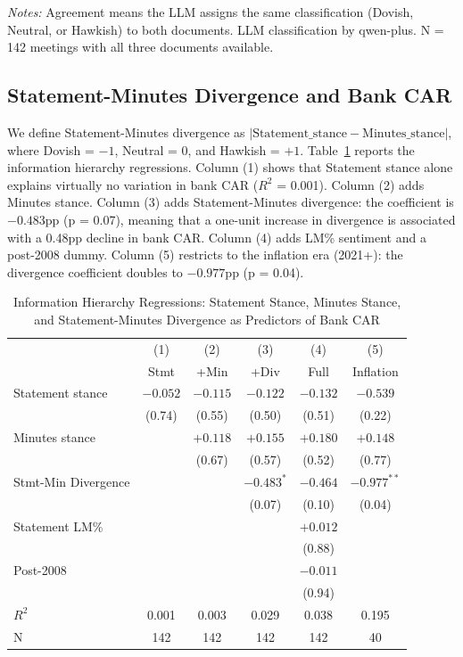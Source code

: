 \documentclass[12pt,a4paper]{article}
\begin{document}
\noindent\textit{Notes:} Agreement means the LLM assigns the same classification (Dovish, Neutral, or Hawkish) to both documents. LLM classification by qwen-plus. N = 142 meetings with all three documents available.

\subsection{Statement-Minutes Divergence and Bank CAR}

We define Statement-Minutes divergence as $|\text{Statement\_stance} - \text{Minutes\_stance}|$, where Dovish = $-1$, Neutral = 0, and Hawkish = $+1$. Table~\ref{tab:hierarchy} reports the information hierarchy regressions. Column (1) shows that Statement stance alone explains virtually no variation in bank CAR ($R^2$ = 0.001). Column (2) adds Minutes stance. Column (3) adds Statement-Minutes divergence: the coefficient is $-0.483$pp (p = 0.07), meaning that a one-unit increase in divergence is associated with a 0.48pp decline in bank CAR. Column (4) adds LM\% sentiment and a post-2008 dummy. Column (5) restricts to the inflation era (2021+): the divergence coefficient doubles to $-0.977$pp (p = 0.04).

\begin{table}[H]
\centering
\caption{Information Hierarchy Regressions: Statement Stance, Minutes Stance, and Statement-Minutes Divergence as Predictors of Bank CAR}
\label{tab:hierarchy}
\small
\begin{tabular}{lccccc}
\toprule
 & (1) & (2) & (3) & (4) & (5) \\
 & Stmt & +Min & +Div & Full & Inflation \\
\midrule
Statement stance & $-0.052$ & $-0.115$ & $-0.122$ & $-0.132$ & $-0.539$ \\
 & (0.74) & (0.55) & (0.50) & (0.51) & (0.22) \\
Minutes stance &  & $+0.118$ & $+0.155$ & $+0.180$ & $+0.148$ \\
 &  & (0.67) & (0.57) & (0.52) & (0.77) \\
Stmt-Min Divergence &  &  & $-0.483^{*}$ & $-0.464$ & $-0.977^{**}$ \\
 &  &  & (0.07) & (0.10) & (0.04) \\
Statement LM\% &  &  &  & $+0.012$ &  \\
 &  &  &  & (0.88) &  \\
Post-2008 &  &  &  & $-0.011$ &  \\
 &  &  &  & (0.94) &  \\
\midrule
$R^2$ & 0.001 & 0.003 & 0.029 & 0.038 & 0.195 \\
N & 142 & 142 & 142 & 142 & 40 \\
\bottomrule
\end{tabular}
\end{table}
\end{document}
